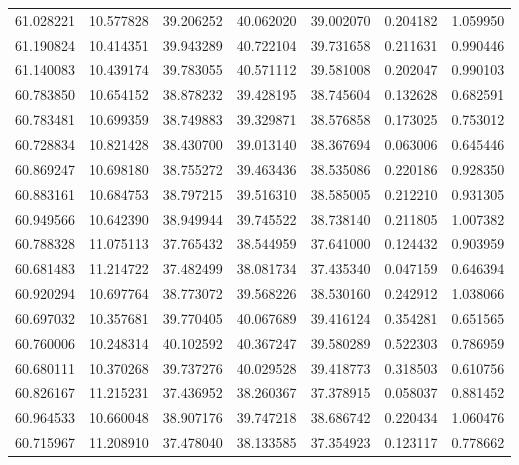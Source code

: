 \begin{tabular}{rrrrrrr}
 61.028221 &  10.577828 &         39.206252 &         40.062020 &         39.002070 &  0.204182 &  1.059950 \\
 61.190824 &  10.414351 &         39.943289 &         40.722104 &         39.731658 &  0.211631 &  0.990446 \\
 61.140083 &  10.439174 &         39.783055 &         40.571112 &         39.581008 &  0.202047 &  0.990103 \\
 60.783850 &  10.654152 &         38.878232 &         39.428195 &         38.745604 &  0.132628 &  0.682591 \\
 60.783481 &  10.699359 &         38.749883 &         39.329871 &         38.576858 &  0.173025 &  0.753012 \\
 60.728834 &  10.821428 &         38.430700 &         39.013140 &         38.367694 &  0.063006 &  0.645446 \\
 60.869247 &  10.698180 &         38.755272 &         39.463436 &         38.535086 &  0.220186 &  0.928350 \\
 60.883161 &  10.684753 &         38.797215 &         39.516310 &         38.585005 &  0.212210 &  0.931305 \\
 60.949566 &  10.642390 &         38.949944 &         39.745522 &         38.738140 &  0.211805 &  1.007382 \\
 60.788328 &  11.075113 &         37.765432 &         38.544959 &         37.641000 &  0.124432 &  0.903959 \\
 60.681483 &  11.214722 &         37.482499 &         38.081734 &         37.435340 &  0.047159 &  0.646394 \\
 60.920294 &  10.697764 &         38.773072 &         39.568226 &         38.530160 &  0.242912 &  1.038066 \\
 60.697032 &  10.357681 &         39.770405 &         40.067689 &         39.416124 &  0.354281 &  0.651565 \\
 60.760006 &  10.248314 &         40.102592 &         40.367247 &         39.580289 &  0.522303 &  0.786959 \\
 60.680111 &  10.370268 &         39.737276 &         40.029528 &         39.418773 &  0.318503 &  0.610756 \\
 60.826167 &  11.215231 &         37.436952 &         38.260367 &         37.378915 &  0.058037 &  0.881452 \\
 60.964533 &  10.660048 &         38.907176 &         39.747218 &         38.686742 &  0.220434 &  1.060476 \\
 60.715967 &  11.208910 &         37.478040 &         38.133585 &         37.354923 &  0.123117 &  0.778662 \\

\end{tabular}
